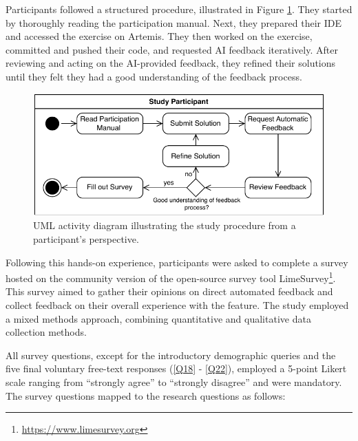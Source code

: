 \documentclass[manuscript,screen,review]{acmart}
\begin{document}
Participants followed a structured procedure, illustrated in Figure \ref{fig:Study-Design}.
They started by thoroughly reading the participation manual.
Next, they prepared their IDE and accessed the exercise on Artemis.
They then worked on the exercise, committed and pushed their code, and requested AI feedback iteratively.
After reviewing and acting on the AI-provided feedback, they refined their solutions until they felt they had a good understanding of the feedback process.

\begin{figure}[htbp]
  \centering
  \includegraphics[width=0.6\linewidth]{figures/Study-Design.pdf}
  \caption{UML activity diagram illustrating the study procedure from a participant's perspective.}
  \label{fig:Study-Design}
\end{figure}

Following this hands-on experience, participants were asked to complete a survey hosted on the community version of the open-source survey tool LimeSurvey\footnote{\url{https://www.limesurvey.org}}.
This survey aimed to gather their opinions on direct automated feedback and collect feedback on their overall experience with the feature.
The study employed a mixed methods approach, combining quantitative and qualitative data collection methods.

All survey questions, except for the introductory demographic queries and the five final voluntary free-text responses (\ref{Q18} - \ref{Q22}), employed a 5-point Likert scale \cite{allen:2007:LikertScalesData} ranging from ``strongly agree'' to ``strongly disagree'' and were mandatory. 
The survey questions mapped to the research questions as follows:
\end{document}
